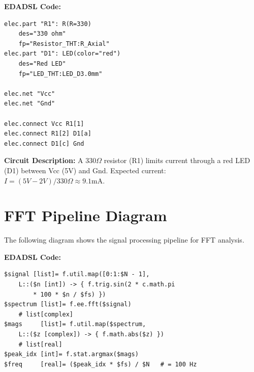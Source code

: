 \textbf{EDADSL Code:}
\begin{verbatim}
elec.part "R1": R(R=330)
    des="330 ohm"
    fp="Resistor_THT:R_Axial"
elec.part "D1": LED(color="red")
    des="Red LED"
    fp="LED_THT:LED_D3.0mm"

elec.net "Vcc"
elec.net "Gnd"

elec.connect Vcc R1[1]
elec.connect R1[2] D1[a]
elec.connect D1[c] Gnd
\end{verbatim}

\vspace{5mm}
\textbf{Circuit Description:} A 330$\Omega$ resistor (R1) limits current through a red LED (D1) between Vcc (5V) and Gnd. Expected current: $I = (5V - 2V) / 330\Omega \approx 9.1\text{mA}$.

\section{FFT Pipeline Diagram}
The following diagram shows the signal processing pipeline for FFT analysis.

\begin{center}
\end{center}

\textbf{EDADSL Code:}
\begin{verbatim}
$signal [list]= f.util.map([0:1:$N - 1],
    L::($n [int]) -> { f.trig.sin(2 * c.math.pi
        * 100 * $n / $fs) })
$spectrum [list]= f.ee.fft($signal)
    # list[complex]
$mags     [list]= f.util.map($spectrum,
    L::($z [complex]) -> { f.math.abs($z) })
    # list[real]
$peak_idx [int]= f.stat.argmax($mags)
$freq     [real]= ($peak_idx * $fs) / $N   # = 100 Hz
\end{verbatim}

